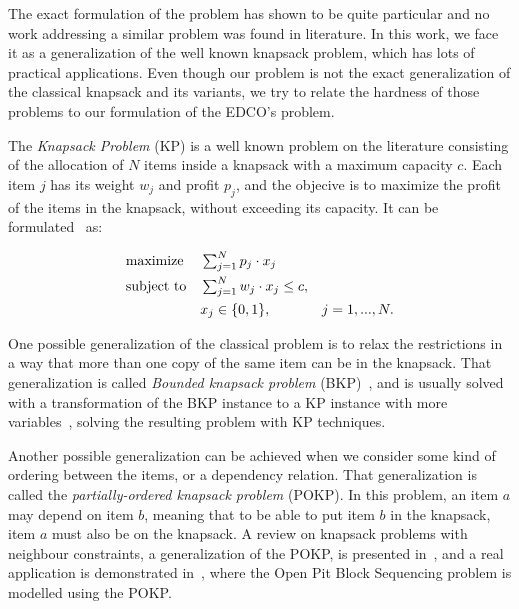 The exact formulation of the problem has shown to be quite particular and no work addressing 
a similar problem was found in literature. In this work, we face it as a generalization
of the well known knapsack problem, which has lots of practical applications. 
Even though our problem is not the exact generalization of the classical knapsack
and its variants, we try to relate the hardness of those problems to our formulation of the
EDCO's problem.

The \textit{Knapsack Problem} (KP) is a well known problem on the literature consisting of the allocation of $N$ items inside a 
knapsack with a maximum capacity $c$. Each item $j$ has its weight $w_j$ and profit $p_j$, and the objecive is to 
maximize the profit of the items in the knapsack, without exceeding its capacity. It can be formulated~\cite{pisinger1995} as:

\begin{equation}
\label{eq:knap01}
  \begin{aligned}
    & \text{maximize}
    & & \mymathstyle \sum_{j=1}^{N} p_j \cdot x_j \\
    & \text{subject to} 
    & & \mymathstyle \sum_{j=1}^{N} w_j \cdot x_j \leq c, \\
    & & & x_j \in \{0,1\}, &j = 1,...,N.
  \end{aligned}
\end{equation}

One possible generalization of the classical problem is to relax the restrictions in a way that more than one 
copy of the same item can be in the knapsack. That generalization is called \textit{Bounded knapsack problem} (BKP)~\cite{pisinger1995}, 
and is usually solved with a transformation of the BKP instance to a KP instance with more variables~\cite{kellerer2004knapsack}, 
solving the resulting problem with KP techniques.

Another possible generalization can be achieved when we consider some kind of ordering between the items, or a dependency relation. 
That generalization is called the \textit{partially-ordered knapsack problem} (POKP)\cite{pok2002}. In this problem, an item $a$ may depend on item $b$, meaning
that to be able to put item $b$ in the knapsack, item $a$ must also be on the knapsack. A review on knapsack problems with neighbour constraints, a generalization of the POKP, is presented
in~\cite{borradaile2012}, and a real application is demonstrated in~\cite{lambert2014}, where the Open Pit Block Sequencing problem is modelled using the POKP.

